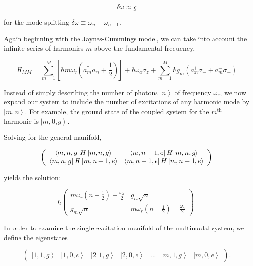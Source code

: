 \documentclass[11 pt, oneside]{book} %
\newcommand{\ket}[1]{\left| #1 \right>} %
\newcommand{\matrixel}[3]{\left< #1 \vphantom{#2#3} \right|
 #2 \left| #3 \vphantom{#1#2} \right>} %
\begin{document}
\begin{equation}
\delta \omega \approx g
\end{equation}

for the mode splitting $\delta \omega \equiv \omega_n-\omega_{n-1}$.

Again beginning with the Jaynes-Cummings model, we can take into account the infinite series of harmonics $m$ above the fundamental frequency,

\begin{equation}
H_{MM}=\sum_{m=1}^M\left[\hbar m\omega_r (a^{\dag}_m a_m+\frac{1}{2})\right]+\hbar\omega_a\sigma_z+\sum^M_{m=1}\hbar g_m(a_m^+\sigma_-+a_m^-\sigma_+)
\end{equation}

Instead of simply describing the number of photons $\ket{n}$ of frequency $\omega_r$, we now expand our system to include the number of excitations of any harmonic mode by $\ket{m,n}$. For example, the ground state of the coupled system for the $m^{\mathrm{th}}$ harmonic is $\ket{m,0,g}$. 

Solving for the general manifold,

\begin{eqnarray}
\nonumber
\left(\begin{array}{cc}
\matrixel{m,n,g}{H}{m,n,g} & \matrixel{m,n-1,e}{H}{m,n,g} \\
\matrixel{m,n,g}{H}{m,n-1,e} & \matrixel{m,n-1,e}{H}{m,n-1,e}
\end{array}\right) 
\end{eqnarray}

yields the solution:

\begin{equation}\label{eq:GeneralSubmatrix}
\hbar \left(\begin{array}{cc}
m\omega_r\left(n+\frac{1}{2}\right)-\frac{\omega_a}{2}	& g_m\sqrt{n} \\
 g_m\sqrt{n}					& m\omega_r\left(n-\frac{1}{2}\right)+\frac{\omega_a}{2}
\end{array}\right).
\end{equation}

In order to examine the single excitation manifold of the multimodal system, we define the eigenstates

\begin{equation}
\left(\begin{array}{ccccccc} \ket{1,1,g} & \ket{1,0,e} & \ket{2,1,g} & \ket{2,0,e} & ... & \ket{m,1, g} & \ket{m,0,e}
\end{array}\right).
\end{equation}
\end{document}
